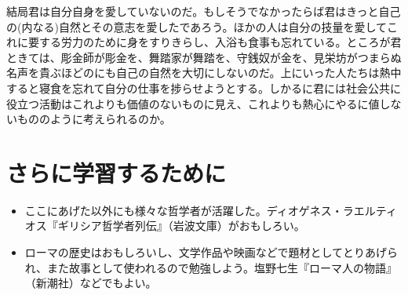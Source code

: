 \documentclass[uplatex,dvipdfmx]{jsarticle} \usepackage{mystyle}%
\begin{document}
  結局君は自分自身を愛していないのだ。もしそうでなかったらば君はきっと自己の(内なる)自然とその意志を愛したであろう。ほかの人は自分の技量を愛してこれに要する労力のために身をすりきらし、入浴も食事も忘れている。ところが君ときては、彫金師が彫金を、舞踏家が舞踏を、守銭奴が金を、見栄坊がつまらぬ名声を貴ぶほどのにも自己の自然を大切にしないのだ。上にいった人たちは熱中すると寝食を忘れて自分の仕事を捗らせようとする。しかるに君には社会公共に役立つ活動はこれよりも価値のないものに見え、これよりも熱心にやるに値しないもののように考えられるのか。


\section{さらに学習するために}

\begin{itemize}
\item ここにあげた以外にも様々な哲学者が活躍した。ディオゲネス・ラエルティオス『ギリシア哲学者列伝』（岩波文庫）がおもしろい。
\item ローマの歴史はおもしろいし、文学作品や映画などで題材としてとりあげられ、また故事として使われるので勉強しよう。塩野七生『ローマ人の物語』（新潮社）などでもよい。
\end{itemize}





 \nocite{エピクロス59:教説と手紙}
 \nocite{エピクテートス58:人生談議:岩波}
 \nocite{マルクスアウレリウス56:自省録}
 \nocite{水田洋06:社会思想小史}
 \nocite{よくわかる法哲学}
 \nocite{よくわかる哲学}

 
\ifx\mybook\undefined


\end{document}
